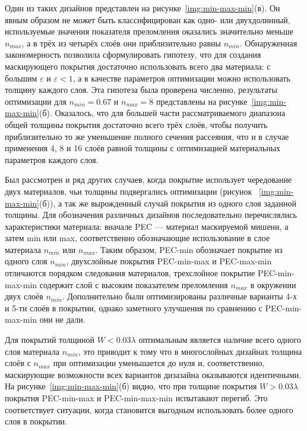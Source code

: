 Один из таких дизайнов представлен на
рисунке~\ref{img:min-max-min}(в). Он явным образом не может быть
классифицирован как одно- или двухдолинный, используемые значения
показателя преломления оказались значительно меньше $n_{max}$, а в
трёх из четырёх слоёв они приблизительно равны $n_{min}$.
Обнаруженная закономерность позволила сформулировать гипотезу, что для
создания маскирующего покрытия достаточно использовать всего два
материала: с большим $\varepsilon$ и ${\varepsilon<1}$, а в качестве
параметров оптимизации можно использовать толщину каждого слоя. Эта
гипотеза была проверена численно, результаты оптимизации для
$n_{min}=0.67$ и $n_{max}=8$ представлены на
рисунке~\ref{img:min-max-min}(б). Оказалось, что для большей части
рассматриваемого диапазона общей толщины покрытия достаточно всего
трёх слоёв, чтобы получить приблизительно то же уменьшение полного
сечения рассеяния, что и в случае применения 4, 8 и 16 слоёв равной
толщины с оптимизацией материальных параметров каждого слоя.

Был рассмотрен и ряд других случаев, когда покрытие использует
чередование двух материалов, чьи толщины подвергались оптимизации
(рисунок ~\ref{img:min-max-min}(б)), а так же вырожденный случай
покрытия из одного слоя заданной толщины.  Для обозначения различных
дизайнов последовательно перечислялись характеристики материала:
вначале PEC --- материал маскируемой мишени, а затем min или max,
соответственно обозначающие использование в слое материала $n_{min}$
или $n_{max}$. Таким образом, PEC-min обозначает покрытие из одного
слоя $n_{min}$, двухслойные покрытия PEC-min-max и PEC-max-min
отличаются порядком следования материалов, трехслойное покрытие
PEC-min-max-min содержит слой с высоким показателем преломления
$n_{max}$ в окружении двух слоёв $n_{min}$. Дополнительно были
оптимизированы различные варианты 4-х и 5-ти слоёв в покрытии, однако
заметного улучшения по сравнению с PEC-min-max-min они не дали.

Для покрытий толщиной $W<0.03\lambda$ оптимальным является наличие
всего одного слоя материала $n_{min}$, это приводит к тому что в
многослойных дизайнах толщина слоёв с $n_{max}$ при оптимизации
уменьшается до нуля и, соответственно, маскирующие возможности всех
вариантов дизазайна оказываются идентичными. На
рисунке~\ref{img:min-max-min}(б) видно, что при толщине покрытия
$W>0.03\lambda$ покрытия PEC-min-max и PEC-min-max-min испытавают
перегиб. Это соответствует ситуации, когда становится выгодным
использовать более одного слоя в покрытии.

